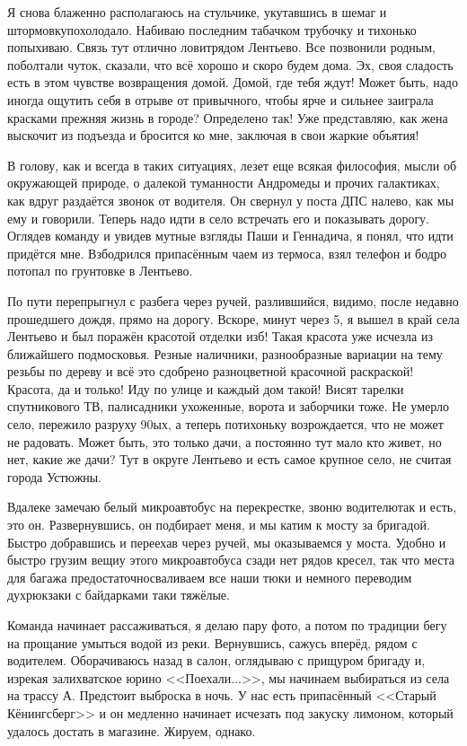 Я снова блаженно располагаюсь на стульчике, укутавшись в шемаг и штормовку\mdash похолодало. Набиваю последним табачком трубочку и тихонько попыхиваю. Связь тут отлично ловит\mdash рядом Лентьево. Все позвонили родным, поболтали чуток, сказали, что всё хорошо и скоро будем дома. Эх, своя сладость есть в этом чувстве возвращения домой. Домой, где тебя ждут! Может быть, надо иногда ощутить себя в отрыве от привычного, чтобы ярче и сильнее заиграла красками прежняя жизнь в городе? Определено так! Уже представляю, как жена выскочит из подъезда и бросится ко мне, заключая в свои жаркие объятия!

В голову, как и всегда в таких ситуациях, лезет еще всякая философия, мысли об окружающей природе, о далекой туманности Андромеды и прочих галактиках, как вдруг раздаётся звонок от водителя. Он свернул у поста ДПС налево, как мы ему и говорили. Теперь надо идти в село встречать его и показывать дорогу. Оглядев команду и увидев мутные взгляды Паши и Геннадича, я понял, что идти придётся мне. Взбодрился припасённым чаем из термоса, взял телефон и бодро потопал по грунтовке в Лентьево. 
 
По пути перепрыгнул с разбега через ручей, разлившийся, видимо, после недавно прошедшего дождя, прямо на дорогу. Вскоре, минут через 5, я вышел в край села Лентьево и был поражён красотой отделки изб! Такая красота уже исчезла из ближайшего подмосковья. Резные наличники, разнообразные вариации на тему резьбы по дереву и всё это сдобрено разноцветной красочной раскраской! Красота, да и только! Иду по улице и каждый дом такой! Висят тарелки спутникового ТВ, палисадники ухоженные, ворота и заборчики тоже. Не умерло село, пережило разруху 90\sdash ых, а теперь потихоньку возрождается, что не может не радовать. Может быть, это только дачи, а постоянно тут мало кто живет, но нет, какие же дачи? Тут в округе Лентьево и есть самое крупное село, не считая города Устюжны.

Вдалеке замечаю белый микроавтобус на перекрестке, звоню водителю\mdash так и есть, это он. Развернувшись, он подбирает меня, и мы катим к мосту за бригадой. Быстро добравшись и переехав через ручей, мы оказываемся у моста. Удобно и быстро грузим вещи\mdash у этого микроавтобуса сзади нет рядов кресел, так что места для багажа предостаточно\mdash сваливаем все наши тюки и немного переводим дух\mdash рюкзаки с байдарками таки тяжёлые. 

Команда начинает рассаживаться, я делаю пару фото, а потом по традиции бегу на прощание умыться водой из реки. Вернувшись, сажусь вперёд, рядом с водителем. Оборачиваюсь назад в салон, оглядываю с прищуром бригаду и, изрекая залихватское юрино <<Поехали$\ldots$>>, мы начинаем выбираться из села на трассу А. Предстоит выброска в ночь. У нас есть припасённый <<Старый Кёнингсберг>> и он медленно начинает исчезать под закуску лимоном, который удалось достать в магазине. Жируем, однако.

